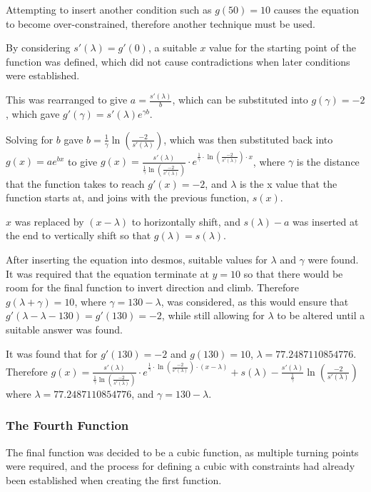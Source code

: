 \documentclass[11pt, letterpaper]{article}
\begin{document}
Attempting to insert another condition such as $g(50)=10$ causes the equation to become over-constrained, therefore another technique must be used. 
	

By considering $s'(\lambda)=g'(0)$, a suitable $x$ value for the starting point of the function was defined, which did not cause contradictions when later conditions were established. 

This was rearranged to give $a=\frac{s'(\lambda)}{b}$, which can be substituted into $g(\gamma)=-2$, which gave $g'(\gamma)=s'(\lambda)e^{\gamma b}$.

Solving for $b$ gave $b=\frac{1}{\gamma}\ln(\frac{-2}{s'(\lambda)})$, which was then substituted back into $g(x)=ae^{bx}$ to give $g(x)=\frac{s'(\lambda)}{\frac{1}{\gamma}\ln(\frac{-2}{s'(\lambda)})}\cdot e^{\frac{1}{\gamma}\cdot \ln (\frac{-2}{s'(\lambda)})\cdot x}$, where $\gamma$ is the distance that the function takes to reach $g'(x)=-2$, and $\lambda$ is the x value that the function starts at, and joins with the previous function, $s(x)$.
		

$x$ was replaced by $(x-\lambda)$ to horizontally shift, and $s(\lambda)-a$ was inserted at the end to vertically shift so that $g(\lambda)=s(\lambda)$.
		

After inserting the equation into desmos, suitable values for $\lambda$ and $\gamma$ were found. It was required that the equation terminate at $y=10$ so that there would be room for the final function to invert direction and climb. Therefore $g(\lambda + \gamma)=10$, where $\gamma=130-\lambda$, was considered, as this would ensure that $g'(\lambda-\lambda-130)=g'(130)=-2$, while still allowing for $\lambda$ to be altered until a suitable answer was found.
		

It was found that for $g'(130)=-2$ and $g(130)=10$, $\lambda=77.2487110854776$. Therefore $g(x)=\frac{s'(\lambda)}{\frac{1}{\gamma}\ln(\frac{-2}{s'(\lambda)})}\cdot e^{\frac{1}{\gamma}\cdot \ln (\frac{-2}{s'(\lambda)})\cdot (x-\lambda)}+s\left(\lambda\right)-\frac{s'(\lambda)}{\frac{1}{\gamma}}\ln\left(\frac{-2}{s'\left(\lambda\right)}\right)$ where $\lambda=77.2487110854776$, and $\gamma=130-\lambda$.





\subsubsection{The Fourth Function}

The final function was decided to be a cubic function, as multiple turning points were required, and the process for defining a cubic with constraints had already been established when creating the first function. 
	
\end{document}
